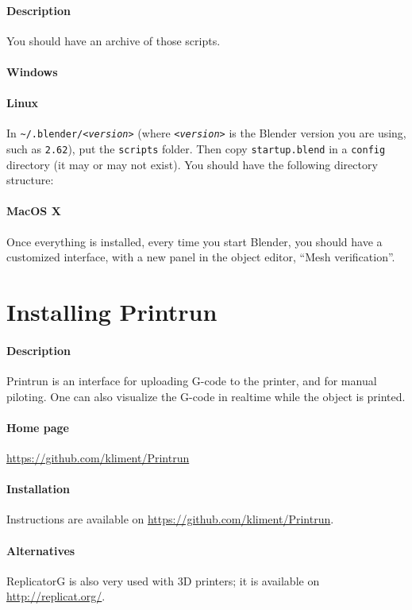 \documentclass{article}
\begin{document}
	\paragraph{Description} You should have an archive of those scripts.

	\paragraph{Windows} %

	\paragraph{Linux} In \texttt{\~ {}/.blender/\emph{<version>}} (where \texttt{\emph{<version>}} is the Blender version you are using, such as \texttt{2.62}), put the \texttt{scripts} folder. Then copy \texttt{startup.blend} in a \texttt{config} directory (it may or may not exist). You should have the following directory structure:\\


	\paragraph{MacOS X} %

	Once everything is installed, every time you start Blender, you should have a customized interface, with a new panel in the object editor, “Mesh verification”.

\newpage

\section{Installing Printrun}

	\paragraph{Description} Printrun is an interface for uploading G-code to the printer, and for manual piloting. One can also visualize the G-code in realtime while the object is printed.

	\paragraph{Home page} \url{https://github.com/kliment/Printrun}

	\paragraph{Installation} Instructions are available on \url{https://github.com/kliment/Printrun}.

	\paragraph{Alternatives} ReplicatorG is also very used with 3D printers; it is available on \url{http://replicat.org/}.
\end{document}
